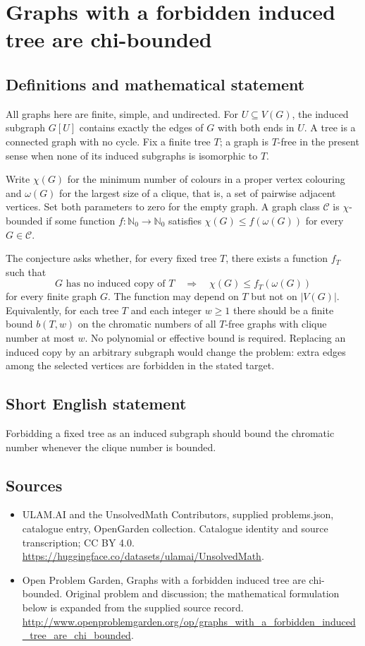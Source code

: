 \documentclass[11pt,a4paper]{article}
\begin{document}
\section*{Graphs with a forbidden induced tree are chi-bounded}\label{statement}

\subsection{Definitions and mathematical statement}
All graphs here are finite, simple, and undirected. For $U\subseteq V(G)$,
the induced subgraph $G[U]$ contains exactly the edges of $G$ with both ends
in $U$. A tree is a connected graph with no cycle. Fix a finite tree $T$;
a graph is $T$-free in the present sense when none of its induced subgraphs
is isomorphic to $T$.

Write $\chi(G)$ for the minimum number of colours in a proper vertex
colouring and $\omega(G)$ for the largest size of a clique, that is, a set
of pairwise adjacent vertices. Set both parameters to zero for the empty
graph. A graph class $\mathcal C$ is $\chi$-bounded if some function
$f:\mathbb N_0\to\mathbb N_0$ satisfies
$\chi(G)\le f(\omega(G))$ for every $G\in\mathcal C$.

The conjecture asks whether, for every fixed tree $T$, there exists a
function $f_T$ such that
\[
  G\text{ has no induced copy of }T
       \quad\Longrightarrow\quad\chi(G)\le f_T(\omega(G))
\]
for every finite graph $G$. The function may depend on $T$ but not on
$|V(G)|$. Equivalently, for each tree $T$ and each integer $w\ge1$ there
should be a finite bound $b(T,w)$ on the chromatic numbers of all
$T$-free graphs with clique number at most $w$. No polynomial or effective
bound is required. Replacing an induced copy by an arbitrary subgraph
would change the problem: extra edges among the selected vertices are
forbidden in the stated target.
\subsection{Short English statement}
Forbidding a fixed tree as an induced subgraph should bound the chromatic number whenever the clique number is bounded.
\subsection{Sources}
\begin{itemize}
\item[S1] ULAM.AI and the UnsolvedMath Contributors, supplied problems.json, catalogue entry, OpenGarden collection. Catalogue identity and source transcription; CC BY 4.0.
\url{https://huggingface.co/datasets/ulamai/UnsolvedMath}.
\item[S2] Open Problem Garden, Graphs with a forbidden induced tree are chi-bounded. Original problem and discussion; the mathematical formulation below is expanded from the supplied source record.
\url{http://www.openproblemgarden.org/op/graphs_with_a_forbidden_induced_tree_are_chi_bounded}.
\end{itemize}
\end{document}
